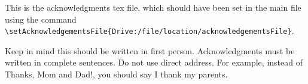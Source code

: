 This is the acknowledgments tex file, which should have been set in the main file using the command \verb|\setAcknowledgementsFile{Drive:/file/location/acknowledgementsFile}|.

Keep in mind this should be written in first person. Acknowledgments must be written in complete sentences. Do not use direct address. For example, instead of Thanks, Mom and Dad!, you should say I thank my parents. 